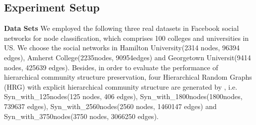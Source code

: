 \documentclass{article}
\theoremstyle{definition}
\begin{document}
	\begin{table}[!h]
	\centering
	\caption{The multi-label classification results on different percentages of test data sets.}
	  \label{tab:classification}
	\end{table}
 

	\subsection{Experiment Setup}

	\noindent \textbf{Data Sets} We employed the following three real datasets in Facebook social networks \cite{Traud2012Social} for node classification, which comprises 100 colleges and universities in US. We choose the social networks in Hamilton University(2314 nodes, 96394 edges), Amherst College(2235nodes, 90954edges) and Georgetown Universit(9414 nodes, 425639 edges). Besides, in order to evaluate the performance of hierarchical community structure preservation, four Hierarchical Random Graphs (HRG) with explicit hierarchical community structure are generated by \cite{clauset2008hierarchical}, i.e. Syn\_with\_125nodes(125 nodes, 406 edges), Syn\_with\_1800nodes(1800nodes, 739637 edges), Syn\_with\_2560nodes(2560 nodes, 1460147 edges) and Syn\_with\_3750nodes(3750 nodes, 3066250 edges).
\end{document}
